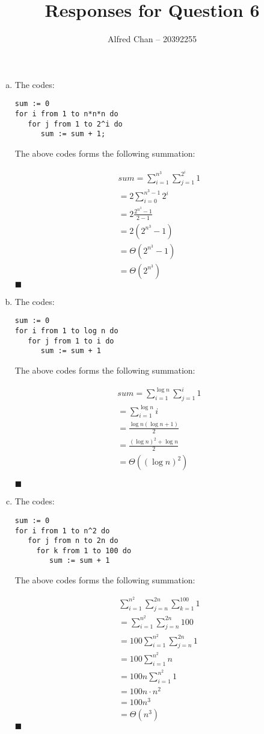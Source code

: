 \documentclass[12pt]{article}
\title{Responses for Question 6}
\author{Alfred Chan -- 20392255}
\begin{document}
\maketitle
\lstset{
	language=bash,
	numbers=left,
	showspaces=false,
	showstringspaces=false,
	stepnumber=1,
	basicstyle=\ttfamily,
	frame=single,
	breaklines=true,
	tabsize=2
}

{\bf

\begin{enumerate}[a.]

\item
The codes:
\begin{lstlisting}
sum := 0
for i from 1 to n*n*n do
   for j from 1 to 2^i do
      sum := sum + 1;
\end{lstlisting}
The above codes forms the following summation:

\begin{gather*}
sum = \sum_{i=1}^{n^3} \sum_{j=1}^{2^i} 1\\
= 2 \sum_{i=0}^{n^3-1} 2^i\\
= 2 \frac{2^{n^3} -1}{2-1}\\
= 2(2^{n^3} - 1)\\
= \Theta(2^{n^3} - 1)\\
= \Theta(2^{n^3})
\end{gather*}
\hfill $\blacksquare$

\item
The codes:
\begin{lstlisting}
sum := 0
for i from 1 to log n do
   for j from 1 to i do
      sum := sum + 1
\end{lstlisting}
The above codes forms the following summation:

\begin{gather*}
sum = \sum_{i=1}^{\log n} \sum_{j=1}^{i} 1\\
= \sum_{i=1}^{\log n} i\\
= \frac{\log n (\log n + 1)}{2}\\
= \frac{(\log n)^2 + \log n}{2}\\
= \Theta((\log n)^2)
\end{gather*}

\hfill $\blacksquare$

\item
The codes:
\begin{lstlisting}
sum := 0
for i from 1 to n^2 do
   for j from n to 2n do
     for k from 1 to 100 do
        sum := sum + 1
\end{lstlisting}
The above codes forms the following summation:

\begin{gather*}
\sum_{i=1}^{n^2} \sum_{j=n}^{2n} \sum_{k=1}^{100} 1\\
=\sum_{i=1}^{n^2} \sum_{j=n}^{2n} 100 \\
=100 \sum_{i=1}^{n^2} \sum_{j=n}^{2n} 1 \\
=100 \sum_{i=1}^{n^2} n \\
=100n \sum_{i=1}^{n^2} 1 \\
=100n \cdot n^2\\
=100n^3\\
=\Theta(n^3)
\end{gather*}
\hfill $\blacksquare$

\end{enumerate}
}
\end{document}
